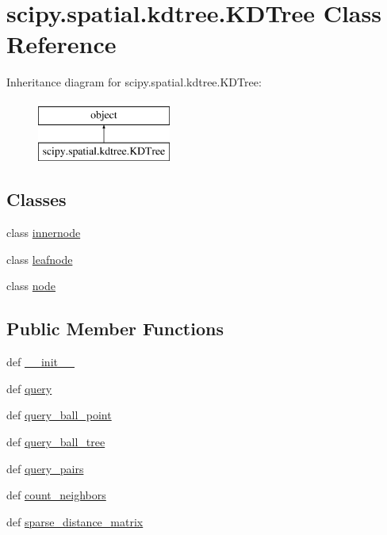 \hypertarget{classscipy_1_1spatial_1_1kdtree_1_1KDTree}{}\section{scipy.\+spatial.\+kdtree.\+K\+D\+Tree Class Reference}
\label{classscipy_1_1spatial_1_1kdtree_1_1KDTree}
Inheritance diagram for scipy.\+spatial.\+kdtree.\+K\+D\+Tree\+:\begin{figure}[H]
\begin{center}
\leavevmode
\includegraphics[height=2.000000cm]{classscipy_1_1spatial_1_1kdtree_1_1KDTree}
\end{center}
\end{figure}
\subsection*{Classes}
\begin{DoxyCompactItemize}
\item 
class \hyperlink{classscipy_1_1spatial_1_1kdtree_1_1KDTree_1_1innernode}{innernode}
\item 
class \hyperlink{classscipy_1_1spatial_1_1kdtree_1_1KDTree_1_1leafnode}{leafnode}
\item 
class \hyperlink{classscipy_1_1spatial_1_1kdtree_1_1KDTree_1_1node}{node}
\end{DoxyCompactItemize}
\subsection*{Public Member Functions}
\begin{DoxyCompactItemize}
\item 
def \hyperlink{classscipy_1_1spatial_1_1kdtree_1_1KDTree_a6eb2743dd105d2796b758d1fc7ec3e00}{\+\_\+\+\_\+init\+\_\+\+\_\+}
\item 
def \hyperlink{classscipy_1_1spatial_1_1kdtree_1_1KDTree_a562327e8239ae3df870296e38d15b79e}{query}
\item 
def \hyperlink{classscipy_1_1spatial_1_1kdtree_1_1KDTree_a4f8639d93206dce7dfef095a1fa9d421}{query\+\_\+ball\+\_\+point}
\item 
def \hyperlink{classscipy_1_1spatial_1_1kdtree_1_1KDTree_ae2d6b0561287117695e24f5becfc2b32}{query\+\_\+ball\+\_\+tree}
\item 
def \hyperlink{classscipy_1_1spatial_1_1kdtree_1_1KDTree_ad86033ebe09f30b5216ad45339fe4367}{query\+\_\+pairs}
\item 
def \hyperlink{classscipy_1_1spatial_1_1kdtree_1_1KDTree_ad6a91f85ae76ae364a34d4051e76fb24}{count\+\_\+neighbors}
\item 
def \hyperlink{classscipy_1_1spatial_1_1kdtree_1_1KDTree_a29b33c027a8aec40ab53c23c4b4ec24c}{sparse\+\_\+distance\+\_\+matrix}
\end{DoxyCompactItemize}
